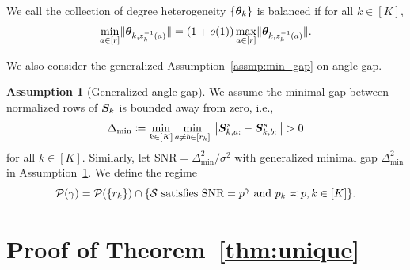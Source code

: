\documentclass[lettersize,journal]{IEEEtran}
\theoremstyle{definition}
\theoremstyle{definition}
\newtheorem{assumption}{Assumption}
\newcommand{\of}[1]{\left(#1\right)}
\begin{document}
We call the collection of degree heterogeneity $\{\boldsymbol{\theta}_k\}$ is balanced if for all $k \in [K]$,
\begin{equation}\label{eq:general_balanced}
    {\min_{a\in[r]} \onormSize{}{\mtheta_{k, z_k^{-1}(a)}}=\left(1+o(1)\right)\max_{a\in[r]}\onormSize{}{\mtheta_{k,z_k^{-1}(a)}}}.
\end{equation}

We also consider the generalized Assumption~\ref{assmp:min_gap} on angle gap.
\begin{assumption}[Generalized angle gap]\label{assmp:general_minimal_gap} We assume the minimal gap between normalized rows of $\bm S_k$ is bounded away from zero, i.e.,
\begin{equation}
     \Delta_{\min} \coloneqq \min_{k \in [K]} \min_{a \neq b \in [r_k]} \left\lVert \bm S_{k,a:}^s - \bm S_{k, b:}^s \right\rVert > 0
\end{equation}
for all $k \in [K]$. Similarly, let $\text{SNR} = \Delta_{\min}^2/\sigma^2$ with generalized minimal gap $\Delta_{\min}^2$ in Assumption~\ref{assmp:general_minimal_gap}. We define the regime
\begin{equation}
    \mathcal{P}(\gamma) = \mathcal{P} (\{r_k\}) \cap\{\mathcal{S} \text{ satisfies $\text{SNR} = p^{\gamma}$ and $p_k \asymp p, k \in [K]$} \}.
\end{equation}
\end{assumption}



\section*{Proof of Theorem~\ref{thm:unique}}
\end{document}
